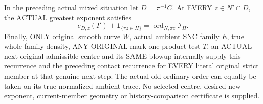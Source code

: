 \begin{theorem}
\label{hir:sharp-original-curve-mixed-new-exceptional-exponent-evolution}
\leanok
In the preceding actual mixed situation let $D=\pi^{-1}C$. At EVERY
$z\in N'\cap D$, the ACTUAL greatest exponent satisfies
\[
 e_{D,z}(I')+\mathbf1_{\{\pi z\in H\}}
       =\operatorname{ord}_{N,\pi z}\mathcal I_H.
\]
Finally, ONLY original smooth curve $W$, actual ambient SNC family $E$,
true whole-family density, ANY ORIGINAL mark-one product test $T$, an
ACTUAL next original-admissible centre and its SAME blowup internally
supply this recurrence and the preceding contact recurrence for EVERY
literal original strict member at that genuine next step. The actual old
ordinary order can equally be taken on its true normalized ambient trace.
No selected centre, desired new exponent, current-member geometry or
history-comparison certificate is supplied.
\end{theorem}
